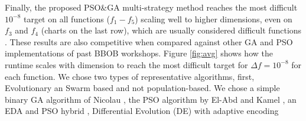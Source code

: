 \documentclass[runningheads]{llncs}
\begin{document}
%
Finally, the proposed PSO\&GA multi-strategy method reaches the most difficult $10^{-8}$ target
on all functions ($f_1-f_5$) scaling well to higher dimensions, even
on $f_3$ and $f_4$ (charts on the last row), which are usually
considered difficult functions \cite{hansen2010comparing}.  %
These results are also competitive when compared against other GA and PSO
implementations of past BBOB workshops. Figure \ref{fig:avg} shows
how the runtime scales with dimension to reach the most difficult target
for $\Delta f = 10^{-8}$ for each function.
We chose two types of representative algorithms, first, Evolutionary 
an Swarm based and  not population-based. We chose a simple binary GA algorithm of Nicolau \cite{nicolau2009application},
the PSO algorithm by El-Abd and Kamel \cite{el2009blackHybrid}, an EDA and PSO
hybrid \cite{el2009blackHybrid}, 
Differential Evolution (DE) with adaptive encoding \cite{povsik2012benchmarking}
\end{document}
